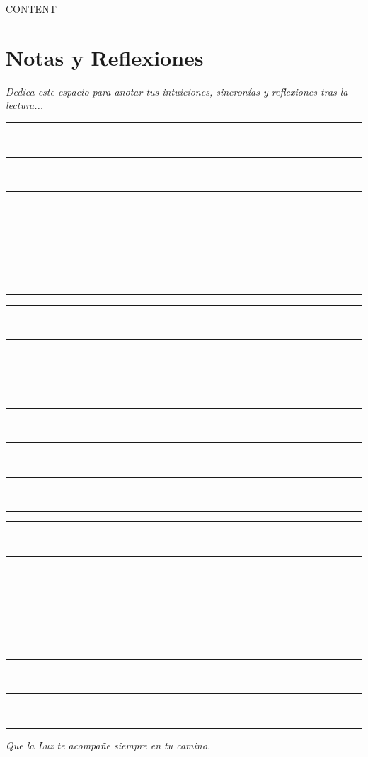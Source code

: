 \documentclass[12pt,twoside,openright]{book}
\begin{document}
\mainmatter

{{CONTENT}}

\backmatter

\cleardoublepage
\thispagestyle{plain}
\chapter*{Notas y Reflexiones}

\vspace{1cm}
\textit{Dedica este espacio para anotar tus intuiciones, sincronías y reflexiones tras la lectura...}

\vspace{1.5cm}
\noindent\rule{\textwidth}{0.4pt}\\[1.5cm]
\noindent\rule{\textwidth}{0.4pt}\\[1.5cm]
\noindent\rule{\textwidth}{0.4pt}\\[1.5cm]
\noindent\rule{\textwidth}{0.4pt}\\[1.5cm]
\noindent\rule{\textwidth}{0.4pt}\\[1.5cm]
\noindent\rule{\textwidth}{0.4pt}

\newpage
\thispagestyle{plain}
\vspace*{1cm}
\noindent\rule{\textwidth}{0.4pt}\\[1.5cm]
\noindent\rule{\textwidth}{0.4pt}\\[1.5cm]
\noindent\rule{\textwidth}{0.4pt}\\[1.5cm]
\noindent\rule{\textwidth}{0.4pt}\\[1.5cm]
\noindent\rule{\textwidth}{0.4pt}\\[1.5cm]
\noindent\rule{\textwidth}{0.4pt}\\[1.5cm]
\noindent\rule{\textwidth}{0.4pt}

\newpage
\thispagestyle{plain}
\vspace*{1cm}
\noindent\rule{\textwidth}{0.4pt}\\[1.5cm]
\noindent\rule{\textwidth}{0.4pt}\\[1.5cm]
\noindent\rule{\textwidth}{0.4pt}\\[1.5cm]
\noindent\rule{\textwidth}{0.4pt}\\[1.5cm]
\noindent\rule{\textwidth}{0.4pt}\\[1.5cm]
\noindent\rule{\textwidth}{0.4pt}\\[1.5cm]
\noindent\rule{\textwidth}{0.4pt}

\cleardoublepage
\thispagestyle{empty}
\vspace*{6cm}
\begin{center}
    \large\textit{Que la Luz te acompañe siempre en tu camino.}
\end{center}
\end{document}
